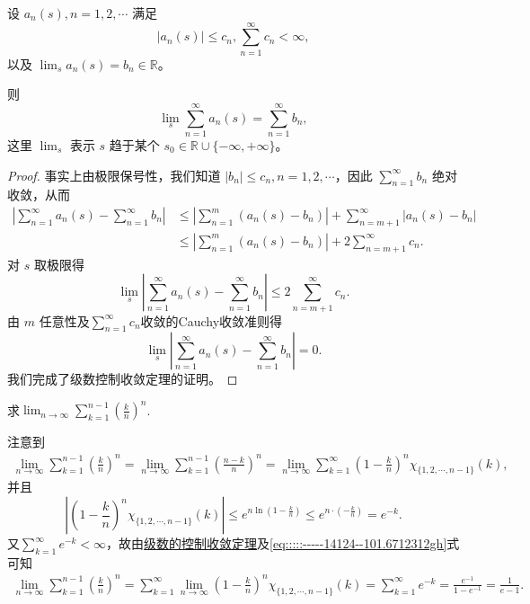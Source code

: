 \documentclass[../../main.tex]{subfiles}%
\begin{document}
\begin{theorem}[级数的控制收敛定理]\label{theorem:级数的控制收敛定理}
设 \( a_n(s), n = 1, 2, \cdots \) 满足
\[
|a_n(s)| \leqslant c_n, \sum_{n = 1}^{\infty} c_n < \infty,
\]
以及 \( \lim_{s} a_n(s) = b_n \in \mathbb{R} \)。

则
\[
\lim_{s} \sum_{n = 1}^{\infty} a_n(s) = \sum_{n = 1}^{\infty} b_n,
\]
这里 \( \lim_{s} \) 表示 \( s \) 趋于某个 \( s_0 \in \mathbb{R} \cup \{-\infty, +\infty\} \)。
\end{theorem}
\begin{proof}

事实上由极限保号性，我们知道 \( |b_n| \leqslant c_n, n = 1, 2, \cdots \)，因此 \( \sum_{n = 1}^{\infty} b_n \) 绝对收敛，从而
\begin{align*}
\left| \sum_{n = 1}^{\infty} a_n(s) - \sum_{n = 1}^{\infty} b_n \right| &\leqslant \left| \sum_{n = 1}^{m} (a_n(s) - b_n) \right| + \sum_{n = m + 1}^{\infty} |a_n(s) - b_n| \\
&\leqslant \left| \sum_{n = 1}^{m} (a_n(s) - b_n) \right| + 2 \sum_{n = m + 1}^{\infty} c_n.
\end{align*}
对 \( s \) 取极限得
\[
\lim_{s} \left| \sum_{n = 1}^{\infty} a_n(s) - \sum_{n = 1}^{\infty} b_n \right| \leqslant 2 \sum_{n = m + 1}^{\infty} c_n.
\]
由 \( m \) 任意性及$\sum_{n=1}^{\infty}{c_n}$收敛的Cauchy收敛准则得
\[
\lim_{s} \left| \sum_{n = 1}^{\infty} a_n(s) - \sum_{n = 1}^{\infty} b_n \right| = 0.
\]
我们完成了级数控制收敛定理的证明。

\end{proof}

\begin{example}
求$\lim_{n\rightarrow \infty}\sum_{k=1}^{n-1}\left( \frac{k}{n} \right) ^n$.
\end{example}
\begin{solution}

注意到
\begin{align}\label{eq:::::-----14124--101.6712312gh}
\lim_{n\rightarrow \infty}\sum_{k=1}^{n-1}\left( \frac{k}{n} \right) ^n=\lim_{n\rightarrow \infty}\sum_{k=1}^{n-1}\left( \frac{n-k}{n} \right) ^n =\lim_{n\rightarrow \infty}\sum_{k=1}^{\infty}\left( 1-\frac{k}{n} \right) ^n\chi _{\{1,2,\cdots ,n-1\}}(k),
\end{align}
并且
\[
\left| \left( 1-\frac{k}{n} \right) ^n\chi _{\{1,2,\cdots ,n-1\}}(k) \right|\leqslant e^{n\ln \left( 1-\frac{k}{n} \right)}\leqslant e^{n\cdot \left( -\frac{k}{n} \right)}=e^{-k}.
\]
又$\sum_{k=1}^{\infty}e^{-k}<\infty$，故由\hyperref[theorem:级数的控制收敛定理]{级数的控制收敛定理}及\eqref{eq:::::-----14124--101.6712312gh}式可知
\begin{align*}
\lim_{n\rightarrow \infty}\sum_{k=1}^{n-1}\left( \frac{k}{n} \right) ^n=\sum_{k=1}^{\infty}\lim_{n\rightarrow \infty}\left( 1-\frac{k}{n} \right) ^n\chi _{\{1,2,\cdots ,n-1\}}(k)=\sum_{k=1}^{\infty}e^{-k}
=\frac{e^{-1}}{1-e^{-1}}=\frac{1}{e-1}.
\end{align*}

\end{solution}
\end{document}
